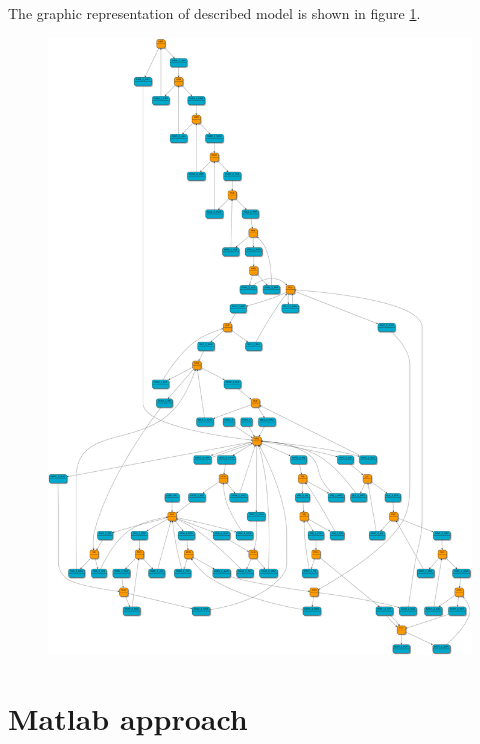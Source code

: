\documentclass[a4paper]{article}
\begin{document}
The graphic representation of described model is shown in figure \ref{fig:img4}.\\

\begin{figure}[h]
\centering
\includegraphics[scale=0.12]{schemas/img4.png}
\caption{\label{fig:img4}}
\end{figure}

\clearpage

%
\section{Matlab approach}
\label{cha:matlabApproach}
\paragraph{}
\end{document}
